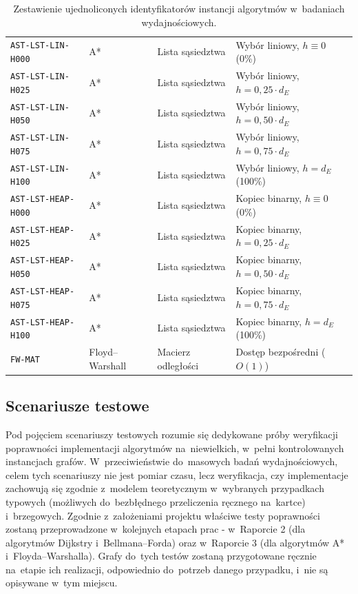 \documentclass[11pt,a4paper,oneside]{report}
\begin{document}
\begin{table}[H]
\begin{tabularx}{\textwidth}{@{}p{}p{}p{}X@{}}
    \texttt{AST-LST-LIN-H000} & A* & Lista sąsiedztwa  & Wybór liniowy, $h \equiv 0$ (0\%) \\
    \texttt{AST-LST-LIN-H025} & A* & Lista sąsiedztwa  & Wybór liniowy, $h = 0{,}25 \cdot d_E$ \\
    \texttt{AST-LST-LIN-H050} & A* & Lista sąsiedztwa  & Wybór liniowy, $h = 0{,}50 \cdot d_E$ \\
    \texttt{AST-LST-LIN-H075} & A* & Lista sąsiedztwa  & Wybór liniowy, $h = 0{,}75 \cdot d_E$ \\
    \texttt{AST-LST-LIN-H100} & A* & Lista sąsiedztwa  & Wybór liniowy, $h = d_E$ (100\%) \\
    \midrule
    \texttt{AST-LST-HEAP-H000} & A* & Lista sąsiedztwa  & Kopiec binarny, $h \equiv 0$ (0\%) \\
    \texttt{AST-LST-HEAP-H025} & A* & Lista sąsiedztwa  & Kopiec binarny, $h = 0{,}25 \cdot d_E$ \\
    \texttt{AST-LST-HEAP-H050} & A* & Lista sąsiedztwa  & Kopiec binarny, $h = 0{,}50 \cdot d_E$ \\
    \texttt{AST-LST-HEAP-H075} & A* & Lista sąsiedztwa  & Kopiec binarny, $h = 0{,}75 \cdot d_E$ \\
    \texttt{AST-LST-HEAP-H100} & A* & Lista sąsiedztwa  & Kopiec binarny, $h = d_E$ (100\%) \\
    \midrule
    \texttt{FW-MAT}        & Floyd--Warshall & Macierz odległości & Dostęp bezpośredni ($O(1)$) \\
    \bottomrule
  \end{tabularx}
  \caption{Zestawienie ujednoliconych identyfikatorów instancji algorytmów w~badaniach wydajnościowych.}
  \label{tab:identyfikatory-instancji}
\end{table} 

\subsection{Scenariusze testowe}

Pod pojęciem scenariuszy testowych rozumie się dedykowane próby weryfikacji poprawności implementacji algorytmów na~niewielkich, w~pełni kontrolowanych instancjach grafów. W~przeciwieństwie do~masowych badań wydajnościowych, celem tych scenariuszy nie jest pomiar czasu, lecz weryfikacja, czy implementacje zachowują się zgodnie z~modelem teoretycznym w~wybranych przypadkach typowych (możliwych do~bezbłędnego przeliczenia ręcznego na~kartce) i~brzegowych. Zgodnie z~założeniami projektu właściwe testy poprawności zostaną przeprowadzone w~kolejnych etapach prac - w~Raporcie 2 (dla algorytmów Dijkstry i~Bellmana--Forda) oraz w~Raporcie 3 (dla algorytmów A* i~Floyda--Warshalla). Grafy do~tych testów zostaną przygotowane ręcznie na~etapie ich realizacji, odpowiednio do~potrzeb danego przypadku, i~nie są opisywane w~tym miejscu.
\end{document}
